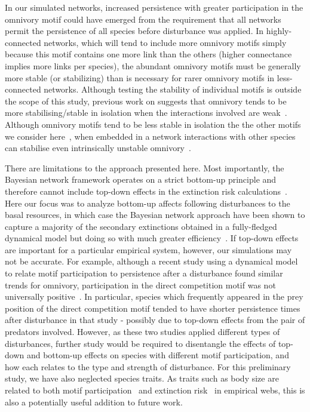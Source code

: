 \documentclass[12pt]{article}
\begin{document}
\begin{spacing}{2.0}
    
    In our simulated networks, increased persistence with greater participation in the omnivory motif could have emerged from the requirement that all networks permit the persistence of all species before disturbance was applied.
    In highly-connected networks, which will tend to include more omnivory motifs simply because this motif contains one more link than the others (higher connectance implies more links per species), the abundant omnivory motifs must be generally more stable (or stabilizing) than is necessary for rarer omnivory motifs in less-connected networks.
    Although testing the stability of individual motifs is outside the scope of this study, previous work on suggests that omnivory tends to be more stabilising/stable in isolation when the interactions involved are weak~\citep{}.
    Although omnivory motifs tend to be less stable in isolation the the other motifs we consider here~\citep{Borrelli2015a}, when embedded in a network interactions with other species can stabilise even intrinsically unstable omnivory~\citep{Kratina2012}.
    
    

    There are limitations to the approach presented here.
    Most importantly, the Bayesian network framework operates on a strict bottom-up principle and therefore cannot include top-down effects in the extinction risk calculations~\citep{Eklof2013}. 
    Here our focus was to analyze bottom-up affects following disturbances to the basal resources, in which case the Bayesian network approach have been shown to capture a majority of the secondary extinctions obtained in a fully-fledged dynamical model but doing so with much greater efficiency~\citep{Eklof2013}.
    If top-down effects are important for a particular empirical system, however, our simulations may not be accurate. 
    For example, although a recent study using a dynamical model to relate motif participation to persistence after a disturbance found similar trends for omnivory, participation in the direct competition motif was not universally positive~\citep{Cirtwill2021_inprep}.
    In particular, species which frequently appeared in the prey position of the direct competition motif tended to have shorter persistence times after disturbance in that study - possibly due to top-down effects from the pair of predators involved.
    However, as these two studies applied different types of disturbances, further study would be required to disentangle the effects of top-down and bottom-up effects on species with different motif participation, and how each relates to the type and strength of disturbance.
    For this preliminary study, we have also neglected species traits.
    As traits such as body size are related to both motif participation~\citep{cirtwill2018feeding} and extinction risk~\citep{Brose2017, curtsdotter2011robustness, Cardillo2005, Purvis2000} in empirical webs, this is also a potentially useful addition to future work. 


\end{spacing}
\end{document}
